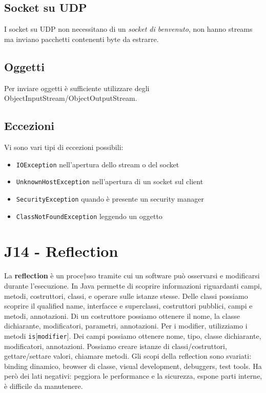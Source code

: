\documentclass[11pt]{article}
\newcommand{\code}[1]{\texttt{#1}}
\begin{document}
\subsection{Socket su UDP}
I socket su UDP non necessitano di un \textit{socket di benvenuto}, non hanno streams ma inviano pacchetti contenenti byte da estrarre. 
\subsection{Oggetti}
Per inviare oggetti è sufficiente utilizzare degli ObjectInputStream/ObjectOutputStream. 
\subsection{Eccezioni}
Vi sono vari tipi di eccezioni possibili:
\begin{itemize}
    \item \code{IOException} nell'apertura dello stream o del socket 
    \item \code{UnknownHostException} nell'apertura di un socket sul client 
    \item \code{SecurityException} quando è presente un security manager
    \item \code{ClassNotFoundException} leggendo un oggetto
\end{itemize}
\section{J14 - Reflection}
La \textbf{reflection} è un proce†sso tramite cui un software può osservarsi e modificarsi durante l'esecuzione. In Java permette di scoprire informazioni riguardanti campi, metodi, costruttori, classi, e operare sulle istanze stesse.
Delle classi possiamo scoprire il qualified name, interfacce e superclassi, costruttori pubblici, campi e metodi, annotazioni. Di un costruttore possiamo ottenere il nome, la classe dichiarante, modificatori, parametri, annotazioni. Per i modifier, utilizziamo i metodi \code{is$[$modifier$]$}. Dei campi possiamo ottenere nome, tipo, classe dichiarante, modificatori, annotazioni. Possiamo creare istanze di classi/costruttori, gettare/settare valori, chiamare metodi. Gli scopi della reflection sono svariati: binding dinamico, browser di classe, visual development, debuggers, test tools. Ha però dei lati negativi: peggiora le performance e la sicurezza, espone parti interne, è difficile da manutenere.





\printglossary
\end{document}
